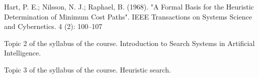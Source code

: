 \documentclass[runningheads]{llncs}
\begin{document}
%
%
%
%
%
%




%
\begin{thebibliography}{8}
Hart, P. E.; Nilsson, N. J.; Raphael, B. (1968). "A Formal Basis for the Heuristic Determination of Minimum Cost Paths". IEEE Transactions on Systems Science and Cybernetics. 4 (2): 100–107 

Topic 2 of the syllabus of the course. Introduction to Search Systems in Artificial Intelligence.

Topic 3 of the syllabus of the course. Heuristic search.
\end{thebibliography}
\end{document}
